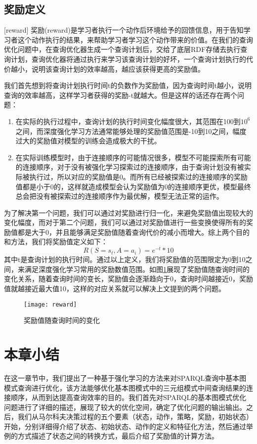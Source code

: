 \subsection{奖励定义}[reward]
奖励(reward)是学习者执行一个动作后环境给予的回馈信息，用于告知学习者这个动作执行的结果，来帮助学习者学习这个动作带来的价值。在我们的查询优化问题中，在查询优化器生成一个查询计划后，交给了底层RDF存储去执行查询计划，查询优化器将通过执行来学习该查询计划的好坏，一个查询计划执行的代价越小，说明该查询计划的效率越高，越应该获得更高的奖励值。

我们首先想到将查询计划执行时间t的负数作为奖励值，因为查询时间t越小，说明查询的效率越高，这样学习者获得的奖励-t就越大。但是这样的话还存在两个问题：
\begin{enumerate}
    \item 在实际的执行过程中，查询计划的执行时间变化幅度很大，其范围在100到$10^6$之间，而深度强化学习方法通常能够处理的奖励值范围是-10到10之间，幅度过大的奖励值对模型的训练会造成极大的干扰。
    \item 在实际训练模型时，由于连接顺序的可能情况很多，模型不可能探索所有可能的连接顺序，对于没有被强化学习探索过的连接顺序，由于查询计划没有被实际被执行过，所以对应的奖励值是0。而所有已经被探索过的连接顺序的奖励值都是小于0的，这样就造成模型会认为奖励值为0的连接顺序更优，模型最终总会把没有被探索过的连接顺序作为最优解，模型无法正常的运作。
\end{enumerate}

为了解决第一个问题，我们可以通过对奖励进行归一化，来避免奖励值出现较大的变化幅度，而对于第二个问题，我们可以通过对奖励值进行一些变换使得所有的奖励值都是大于0，并且能够满足奖励值随着查询代价的减小而增大。综上两个目的和方法，我们将奖励值定义如下：
\begin{equation}
    R(S=s_t,A=a_i)=e^{-t}*10
\end{equation}
其中t是查询计划的执行时间。通过以上定义，我们将奖励值的范围限定为0到10之间，来满足深度强化学习常用的奖励数值范围。如图\ref{reward}展现了奖励值随查询时间的变化关系，随着查询时间的变长，奖励值会逐渐趋向于0，查询时间越接近0，奖励值就越接近最大值10，这样的对应关系就可以解决上文提到的两个问题。
\begin{figure}[h]
    \centering
    \texttt{[image: reward]}
    \caption{奖励值随查询时间的变化}
    \label{reward}
\end{figure}
\section{本章小结}
在这一章节中，我们提出了一种基于强化学习的方法来对SPARQL查询中基本图模式查询进行优化，该方法能够优化基本图模式中的三元组模式中间查询结果的连接顺序，从而到达提高查询效率的目的。我们首先对SPARQL的基本图模式优化问题进行了详细的描述，展现了较大的优化空间，确定了优化问题的输出输出。之后，我们从马尔科夫决策过程的五个要素（状态，动作，策略，奖励，初始状态）开始，分别详细得介绍了状态、初始状态、动作的定义和特征化方法，然后通过举例的方式描述了状态之间的转换方式，最后介绍了奖励值的计算方法。

